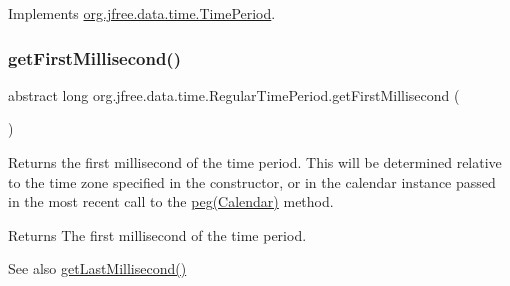 Implements \mbox{\hyperlink{interfaceorg_1_1jfree_1_1data_1_1time_1_1_time_period_aa0fe39753e3af6252b98f5ff9f534f51}{org.\+jfree.\+data.\+time.\+Time\+Period}}.

\mbox{\label{classorg_1_1jfree_1_1data_1_1time_1_1_regular_time_period_a7aa230d10a6d78c81db0b74dce832526}} 
\subsubsection{\texorpdfstring{get\+First\+Millisecond()}{getFirstMillisecond()}\hspace{0.1cm}{\footnotesize\ttfamily [1/3]}}
{\footnotesize\ttfamily abstract long org.\+jfree.\+data.\+time.\+Regular\+Time\+Period.\+get\+First\+Millisecond (\begin{DoxyParamCaption}{ }\end{DoxyParamCaption})\hspace{0.3cm}{\ttfamily [abstract]}}

Returns the first millisecond of the time period. This will be determined relative to the time zone specified in the constructor, or in the calendar instance passed in the most recent call to the \mbox{\hyperlink{classorg_1_1jfree_1_1data_1_1time_1_1_regular_time_period_ae3251d790d4e91328a451b741bfa1e37}{peg(\+Calendar)}} method.

\begin{DoxyReturn}{Returns}
The first millisecond of the time period.
\end{DoxyReturn}
\begin{DoxySeeAlso}{See also}
\mbox{\hyperlink{classorg_1_1jfree_1_1data_1_1time_1_1_regular_time_period_ab5ad818ae1c90ec6efd57304594e6801}{get\+Last\+Millisecond()}} 
\end{DoxySeeAlso}
\mbox{\label{classorg_1_1jfree_1_1data_1_1time_1_1_regular_time_period_a2e46e03754784f461b73ceb910a36afa}} 
